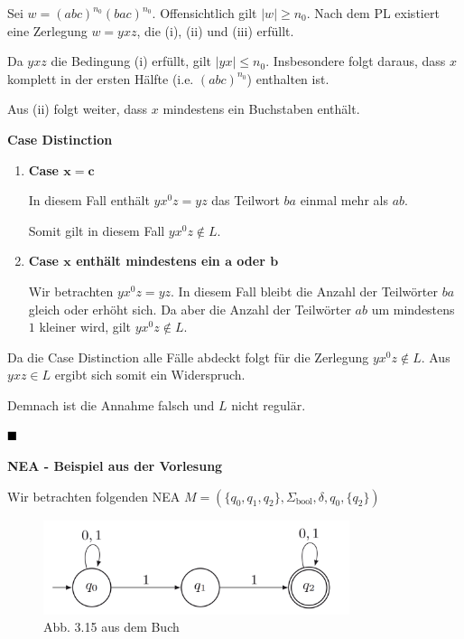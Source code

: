 \documentclass[a4paper, 11pt]{article}
\newcommand\myTitle[1]{{\large \textbf {#1}}}
\begin{document}
        Sei $w = (abc)^{n_0}(bac)^{n_0}$. Offensichtlich gilt $|w| \geq n_0$. Nach dem PL existiert eine Zerlegung $w = yxz$, die (i), (ii) und (iii) erfüllt.
        
        Da $yxz$ die Bedingung (i) erfüllt, gilt $|yx| \leq n_0$. Insbesondere folgt daraus, dass $x$ komplett in der ersten Hälfte (i.e. $(abc)^{n_0}$) enthalten ist.
    
        Aus (ii) folgt weiter, dass $x$ mindestens ein Buchstaben enthält.
    
        \textbf{Case Distinction}
        \begin{enumerate}[label=\Roman*.]
            \item \textbf{Case $\mathbf{x = c}$}
            
            In diesem Fall enthält $yx^0z = yz$ das Teilwort $ba$ einmal mehr als $ab$. 
    
            Somit gilt in diesem Fall $yx^0z \notin L$.
            
            \item \textbf{Case $\mathbf{x}$ enthält mindestens ein $\mathbf{a}$ oder $\mathbf{b}$}
            
            Wir betrachten $yx^0z = yz$. 
            In diesem Fall bleibt die Anzahl der Teilwörter $ba$ gleich oder erhöht sich. 
            Da aber die Anzahl der Teilwörter $ab$ um mindestens $1$ kleiner wird, gilt $yx^0z \notin L$.
        \end{enumerate}
        
        Da die Case Distinction alle Fälle abdeckt folgt für die Zerlegung $yx^0z \notin L$. Aus $yxz \in L$ ergibt sich somit ein Widerspruch. 
    
        Demnach ist die Annahme falsch und $L$ nicht regulär.
    
        $\hfill\blacksquare$
    
        
        \pagebreak
    
        \myTitle{NEA - Beispiel aus der Vorlesung}
        
        Wir betrachten folgenden NEA $M = (\{q_0,q_1,q_2\}, \Sigma_{\text{bool}}, \delta, q_0, \{q_2\})$
        \begin{figure}[htp]
            \centering
            \includegraphics[width=0.8\textwidth]{Images/Beispiel_NEA.png}
            \caption[]{Abb. 3.15 aus dem Buch}
        \end{figure}
    
\end{document}
